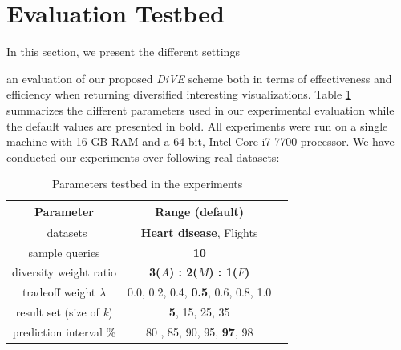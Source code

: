 
\section{Evaluation Testbed}\label{sec:experimental_testbed}

In this section, we present the different settings 

an evaluation of our proposed {\em DiVE} scheme both in terms of effectiveness and efficiency when returning diversified interesting visualizations. 
%
Table \ref{tab:tab-parameter} summarizes the different parameters used in our experimental evaluation while the default values are presented in bold.  All experiments were run on a single machine with 16 GB RAM and a 64 bit, Intel Core i7-7700 processor. We have conducted our experiments over following real datasets:


\begin{table}
	\caption{Parameters testbed in the experiments}
	\label{tab:tab-parameter}
	\begin{tabular}{ccl}
		\toprule
		Parameter &Range (\textbf{default})\\
		\midrule\
		datasets & \textbf{Heart disease}, Flights\\
		sample queries & \textbf{10} \\
		diversity weight ratio & \textbf{3($ A $) : 2($ M $) : 1($ F $)} \\
		tradeoff weight $ \lambda $ & 0.0, 0.2, 0.4, \textbf{0.5}, 0.6, 0.8, 1.0 \\
		result set (size of \textit{k}) & \textbf{5}, 15, 25, 35\\
		prediction interval \% & 80 , 85, 90, 95, \textbf{97}, 98\\
		\bottomrule
	\end{tabular}
\end{table}

